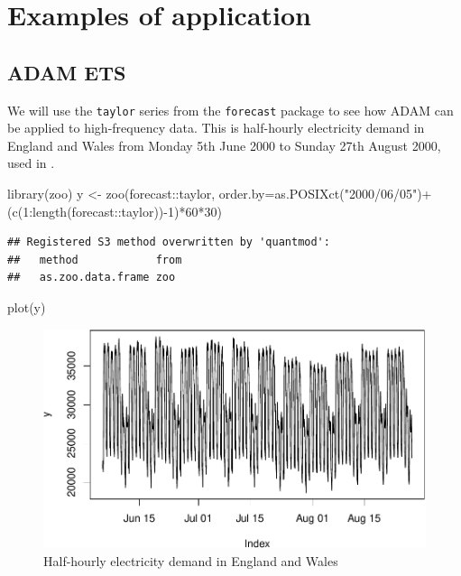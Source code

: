 \documentclass[
]{book}
\newenvironment{Shaded}{\begin{snugshade}}{\end{snugshade}}
\newcommand{\AttributeTok}[1]{\textcolor[rgb]{0.77,0.63,0.00}{#1}}
\newcommand{\DecValTok}[1]{\textcolor[rgb]{0.00,0.00,0.81}{#1}}
\newcommand{\FunctionTok}[1]{\textcolor[rgb]{0.00,0.00,0.00}{#1}}
\newcommand{\NormalTok}[1]{#1}
\newcommand{\OtherTok}[1]{\textcolor[rgb]{0.56,0.35,0.01}{#1}}
\newcommand{\SpecialCharTok}[1]{\textcolor[rgb]{0.00,0.00,0.00}{#1}}
\newcommand{\StringTok}[1]{\textcolor[rgb]{0.31,0.60,0.02}{#1}}
\theoremstyle{definition}
\theoremstyle{definition}
\theoremstyle{definition}
\theoremstyle{definition}
\theoremstyle{remark}
\begin{document}
\hypertarget{ADAMMultipleFrequenciesExamples}{%
\section{Examples of application}\label{ADAMMultipleFrequenciesExamples}}

\hypertarget{adam-ets}{%
\subsection{ADAM ETS}\label{adam-ets}}

We will use the \texttt{taylor} series from the \texttt{forecast} package to see how ADAM can be applied to high-frequency data. This is half-hourly electricity demand in England and Wales from Monday 5th June 2000 to Sunday 27th August 2000, used in \citet{Taylor2003a}.

\begin{Shaded}
\begin{Highlighting}[]
\FunctionTok{library}\NormalTok{(zoo)}
\NormalTok{y }\OtherTok{\textless{}{-}} \FunctionTok{zoo}\NormalTok{(forecast}\SpecialCharTok{::}\NormalTok{taylor,}
         \AttributeTok{order.by=}\FunctionTok{as.POSIXct}\NormalTok{(}\StringTok{"2000/06/05"}\NormalTok{)}\SpecialCharTok{+}
\NormalTok{           (}\FunctionTok{c}\NormalTok{(}\DecValTok{1}\SpecialCharTok{:}\FunctionTok{length}\NormalTok{(forecast}\SpecialCharTok{::}\NormalTok{taylor))}\SpecialCharTok{{-}}\DecValTok{1}\NormalTok{)}\SpecialCharTok{*}\DecValTok{60}\SpecialCharTok{*}\DecValTok{30}\NormalTok{)}
\end{Highlighting}
\end{Shaded}

\begin{verbatim}
## Registered S3 method overwritten by 'quantmod':
##   method            from
##   as.zoo.data.frame zoo
\end{verbatim}

\begin{Shaded}
\begin{Highlighting}[]
\FunctionTok{plot}\NormalTok{(y)}
\end{Highlighting}
\end{Shaded}

\begin{figure}
\centering
\includegraphics{Svetunkov--2022----ADAM_files/figure-latex/taylorSeries-1.pdf}
\caption{\label{fig:taylorSeries}Half-hourly electricity demand in England and Wales}
\end{figure}
\end{document}
